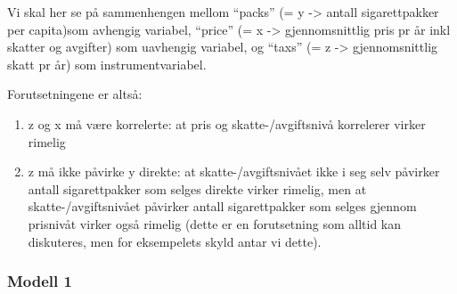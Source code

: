 \documentclass[
]{article}
\newenvironment{Shaded}{\begin{snugshade}}{\end{snugshade}}
\newcommand{\CommentTok}[1]{\textcolor[rgb]{0.56,0.35,0.01}{\textit{#1}}}
\newcommand{\FunctionTok}[1]{\textcolor[rgb]{0.00,0.00,0.00}{#1}}
\newcommand{\NormalTok}[1]{#1}
\newcommand{\SpecialCharTok}[1]{\textcolor[rgb]{0.00,0.00,0.00}{#1}}
\providecommand{\tightlist}{%
  \setlength{\itemsep}{0pt}\setlength{\parskip}{0pt}}
\begin{document}
Vi skal her se på sammenhengen mellom ``packs'' (= y -\textgreater{} antall sigarettpakker per capita)som avhengig variabel, ``price'' (= x -\textgreater{} gjennomsnittlig pris pr år inkl skatter og avgifter) som uavhengig variabel, og ``taxs'' (= z -\textgreater{} gjennomsnittlig skatt pr år) som instrumentvariabel.

Forutsetningene er altså:

\begin{enumerate}
\def\labelenumi{\arabic{enumi}.}
\tightlist
\item
  z og x må være korrelerte: at pris og skatte-/avgiftsnivå korrelerer virker rimelig
\item
  z må ikke påvirke y direkte: at skatte-/avgiftsnivået ikke i seg selv påvirker antall sigarettpakker som selges direkte virker rimelig, men at skatte-/avgiftsnivået påvirker antall sigarettpakker som selges gjennom prisnivåt virker også rimelig (dette er en forutsetning som alltid kan diskuteres, men for eksempelets skyld antar vi dette).
\end{enumerate}

\begin{Shaded}
\end{Shaded}

\hypertarget{modell-1}{%
\subsubsection{Modell 1}\label{modell-1}}
\end{document}
